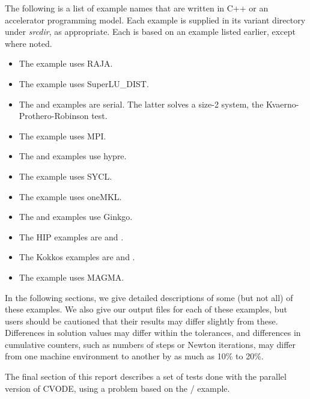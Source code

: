 The following is a list of example names that are written in C++ or an
accelerator programming model. Each example is supplied in its variant directory
under {\em srcdir}, as appropriate. Each is based on an
example listed earlier, except where noted.

\begin{itemize}
\item The  example uses RAJA.
\item The  example uses SuperLU\_DIST.
\item The  and  examples are serial. The latter
  solves a size-2 system, the Kvaerno-Prothero-Robinson test.
\item The  example uses MPI.
\item The  and
   examples use hypre.
\item The  example uses SYCL.
\item The  example uses oneMKL.
\item The  and
   examples use Ginkgo.
\item The HIP examples are  and
  .
\item The Kokkos examples are  and
  .
\item The  example uses MAGMA.

\end{itemize}

\vspace{0.2in}\noindent
In the following sections, we give detailed descriptions of some (but
not all) of these examples.  We also give our output files for
each of these examples, but users should be cautioned that their
results may differ slightly from these.  Differences in solution
values may differ within the tolerances, and differences in cumulative
counters, such as numbers of steps or Newton iterations, may differ
from one machine environment to another by as much as 10\% to 20\%.

The final section of this report describes a set of tests done with the
parallel version of CVODE, using a problem based on the
/ example.

